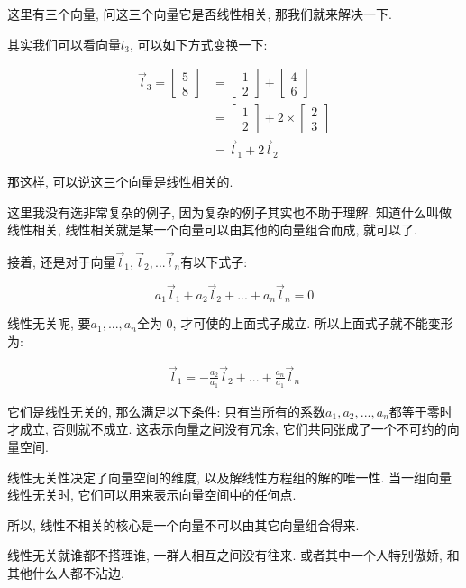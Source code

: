 这里有三个向量, 问这三个向量它是否线性相关, 那我们就来解决一下. 

其实我们可以看向量$l_3$, 可以如下方式变换一下: 

\begin{align*}
  \vec l_3 = \begin{bmatrix} 5 \\ 8 \end{bmatrix} & = \begin{bmatrix} 1 \\ 2 \end{bmatrix} + \begin{bmatrix} 4 \\ 6 \end{bmatrix} \\
  & = \begin{bmatrix} 1 \\ 2 \end{bmatrix} + 2 \times \begin{bmatrix} 2 \\ 3 \end{bmatrix} \\
  & = \vec l_1 + 2 \vec l_2
\end{align*}

那这样, 可以说这三个向量是线性相关的. 

这里我没有选非常复杂的例子, 因为复杂的例子其实也不助于理解. 知道什么叫做线性相关, 线性相关就是某一个向量可以由其他的向量组合而成, 就可以了. 

接着, 还是对于向量\(\vec l_1, \vec l_2, ... \vec l_n\)有以下式子: 

\[a_1 \vec l_1 + a_2 \vec l_2 + ... + a_n \vec l_n = 0\]

线性无关呢, 要$a_1, ..., a_n$全为 0, 才可使的上面式子成立. 所以上面式子就不能变形为: 

\begin{align*}
  \vec l_1 = -\frac{a_2}{a_1} \vec l_2 + ... + \frac{a_n}{a_1} \vec l_n
\end{align*}

它们是线性无关的, 那么满足以下条件: 只有当所有的系数$a_1, a_2, ..., a_n$都等于零时才成立, 否则就不成立. 这表示向量之间没有冗余, 它们共同张成了一个不可约的向量空间. 

线性无关性决定了向量空间的维度, 以及解线性方程组的解的唯一性. 当一组向量线性无关时, 它们可以用来表示向量空间中的任何点. 

所以, 线性不相关的核心是一个向量不可以由其它向量组合得来. 

线性无关就谁都不搭理谁, 一群人相互之间没有往来. 或者其中一个人特别傲娇, 和其他什么人都不沾边. 

